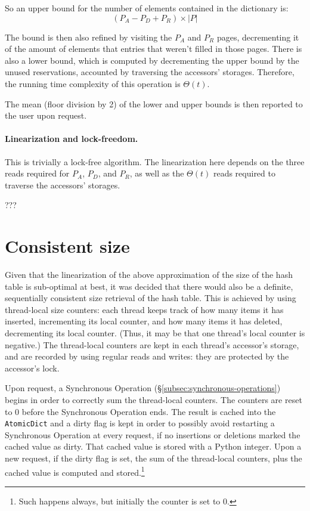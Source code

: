 So an upper bound for the number of elements contained in the dictionary is:
\[
(P_A - P_D + P_R) \times |P|
\]

The bound is then also refined by visiting the $P_A$ and $P_R$ pages, decrementing it of the amount of elements that entries that weren't filled in those pages.
There is also a lower bound, which is computed by decrementing the upper bound by the unused reservations, accounted by traversing the accessors' storages.
Therefore, the running time complexity of this operation is $\Theta(t)$.

The mean (floor division by 2) of the lower and upper bounds is then reported to the user upon request.

\paragraph{Linearization and lock-freedom.}
This is trivially a lock-free algorithm.
The linearization here depends on the three reads required for $P_A$, $P_D$, and $P_R$, as well as the $\Theta(t)$ reads required to traverse the accessors' storages.

???

\section{Consistent size}\label{sec:consistent-size}

Given that the linearization of the above approximation of the size of the hash table is sub-optimal at best, it was decided that there would also be a definite, sequentially consistent size retrieval of the hash table.
This is achieved by using thread-local size counters: each thread keeps track of how many items it has inserted, incrementing its local counter, and how many items it has deleted, decrementing its local counter.
(Thus, it may be that one thread's local counter is negative.)
The thread-local counters are kept in each thread's accessor's storage, and are recorded by using regular reads and writes: they are protected by the accessor's lock.

Upon request, a Synchronous Operation (\S\ref{subsec:synchronous-operations}) begins in order to correctly sum the thread-local counters.
The counters are reset to 0 before the Synchronous Operation ends.
The result is cached into the \texttt{AtomicDict} and a dirty flag is kept in order to possibly avoid restarting a Synchronous Operation at every request, if no insertions or deletions marked the cached value as dirty.
That cached value is stored with a Python integer.
Upon a new request, if the dirty flag is set, the sum of the thread-local counters, plus the cached value is computed and stored.\footnote{%
	Such happens always, but initially the counter is set to 0.
}

